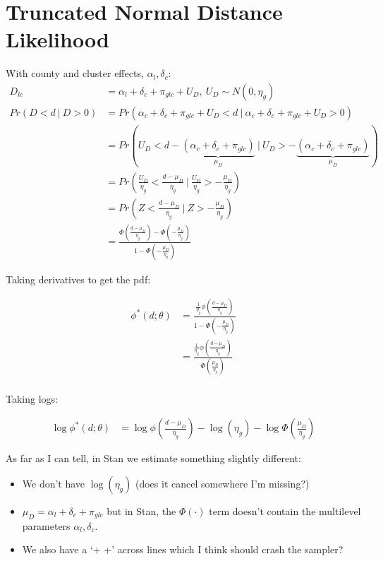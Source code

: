 \documentclass{article}
\begin{document}
    

\section*{Truncated Normal Distance Likelihood}

With county and cluster effects, $\alpha_l, \delta_c$:
\begin{align*}
  D_{lc} &= \alpha_l + \delta_c + \pi_{glc} + U_D, \ U_D \sim N(0, \eta_g) \\
  Pr(D < d \ |\  D > 0 ) &= Pr(\alpha_c + \delta_c + \pi_{glc} + U_D < d \ | \ 
  \alpha_c + \delta_c + \pi_{glc} + U_D > 0) \\
   &= Pr( U_D < d -  \underbrace{(\alpha_c + \delta_c + \pi_{glc})}_{\mu_D}\   |\  
    U_D > - \underbrace{(\alpha_c + \delta_c + \pi_{glc})}_{\mu_D}) \\ 
   &= Pr\left( \frac{U_D}{\eta_g} <  \frac{d - \mu_D}{\eta_g} \   |\  
    \frac{U_D}{\eta_g} > - \frac{\mu_D}{\eta_g}\right) \\  
    &= Pr(Z < \frac{d - \mu_D}{\eta_g} \ |\  Z > -\frac{\mu_D}{\eta_g} ) \\
    &= \frac{
      \Phi\left( \frac{d - \mu_D}{\eta_g}\right) - \Phi\left(
        -\frac{\mu_D}{\eta_g}
      \right)
    }{1 - \Phi\left(-\frac{\mu_D}{\eta_g}\right)}
\end{align*}

Taking derivatives to get the pdf:

\begin{align*}
  \phi^*(d; \theta) &= \frac{
    \frac{1}{\eta_g}\phi\left(\frac{d - \mu_D}{\eta_g}\right)
  }{1 - \Phi\left(-\frac{\mu_D}{\eta_g}\right)} \\ 
   &= \frac{
    \frac{1}{\eta_g}\phi\left(\frac{d - \mu_D}{\eta_g}\right)
  }{\Phi\left(\frac{\mu_D}{\eta_g}\right)} \\ 
\end{align*}


Taking logs:

\begin{align*}
  \log \phi^*(d;\theta) &= \log \phi\left(\frac{d - \mu_D}{\eta_g}\right) - 
  \log(\eta_g) - \log \Phi\left(\frac{\mu_D}{\eta_g}\right)
\end{align*}

As far as I can tell, in Stan we estimate something slightly different:

\begin{itemize}
  \item We don't have $\log(\eta_g)$ (does it cancel somewhere I'm missing?)
  \item $\mu_D = \alpha_l + \delta_c + \pi_{glc}$ but in Stan, the $\Phi(\cdot)$ 
   term doesn't contain the multilevel parameters $\alpha_l, \delta_c$.
   \item We also have a `+ +' across lines which I think should crash the sampler?
\end{itemize}
\end{document}
